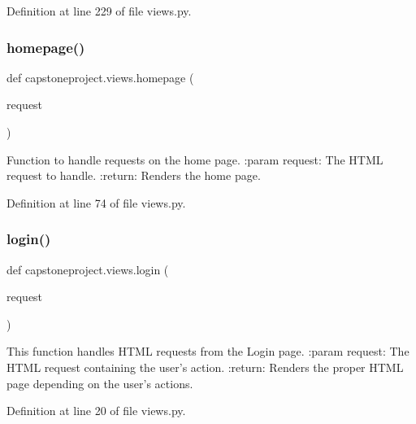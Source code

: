 Definition at line 229 of file views.\+py.

\mbox{\label{namespacecapstoneproject_1_1views_a9319d58ed878e004d1f9eca04ce55c59}} 
\subsubsection{\texorpdfstring{homepage()}{homepage()}}
{\footnotesize\ttfamily def capstoneproject.\+views.\+homepage (\begin{DoxyParamCaption}\item[{}]{request }\end{DoxyParamCaption})}

\begin{DoxyVerb}Function to handle requests on the home page.
:param request: The HTML request to handle.
:return: Renders the home page.
\end{DoxyVerb}
 

Definition at line 74 of file views.\+py.

\mbox{\label{namespacecapstoneproject_1_1views_a01b76b80484781d4941bf80644e0e6b3}} 
\subsubsection{\texorpdfstring{login()}{login()}}
{\footnotesize\ttfamily def capstoneproject.\+views.\+login (\begin{DoxyParamCaption}\item[{}]{request }\end{DoxyParamCaption})}

\begin{DoxyVerb}This function handles HTML requests from the Login page.
:param request: The HTML request containing the user's action.
:return: Renders the proper HTML page depending on the user's actions.
\end{DoxyVerb}
 

Definition at line 20 of file views.\+py.

\mbox{\label{namespacecapstoneproject_1_1views_a4138b830a9b5f13d5b1457b283e2d8e5}} 
